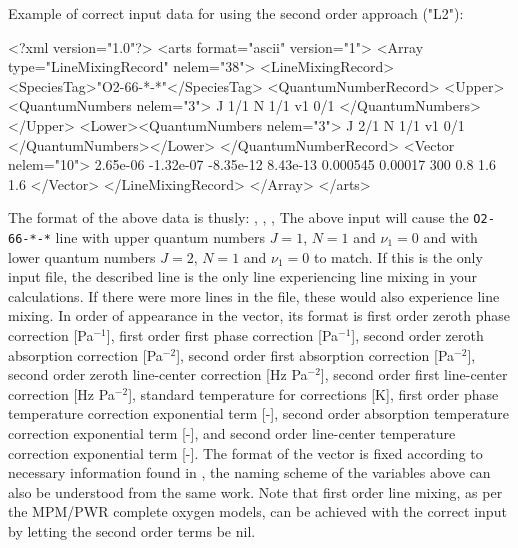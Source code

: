 Example of correct input data for using the second order approach ("L2"):
\begin{code}
<?xml version="1.0"?>
<arts format="ascii" version="1">
<Array type="LineMixingRecord" nelem="38">
<LineMixingRecord>
<SpeciesTag>"O2-66-*-*"</SpeciesTag>
<QuantumNumberRecord>
<Upper><QuantumNumbers nelem="3"> 
  J 1/1 N 1/1 v1 0/1 
</QuantumNumbers></Upper>
<Lower><QuantumNumbers nelem="3"> 
  J 2/1 N 1/1 v1 0/1 
</QuantumNumbers></Lower>
</QuantumNumberRecord>
<Vector nelem="10">
2.65e-06
-1.32e-07
-8.35e-12
8.43e-13
0.000545
0.00017
300
0.8
1.6
1.6
</Vector>
</LineMixingRecord>
</Array>
</arts>
\end{code}
The format of the above data is thusly: ,
, , 
The above input will cause the \verb|O2-66-*-*| line with
upper quantum numbers $J=1$, $N=1$ and $\nu_1=0$ and with
lower quantum numbers $J=2$, $N=1$ and $\nu_1=0$ to match.
If this is the only input file, the described line is the only
line experiencing line mixing in your calculations. If there
were more lines in the file, these would also experience line mixing.
In order of appearance in the vector, its format is 
first order zeroth phase correction [Pa$^{-1}$], 
first order first phase correction [Pa$^{-1}$],
second order zeroth absorption correction [Pa$^{-2}$],
second order first absorption correction [Pa$^{-2}$],
second order zeroth line-center correction [Hz Pa$^{-2}$],
second order first line-center correction [Hz Pa$^{-2}$],
standard temperature for corrections [K],
first order phase temperature correction exponential term [-],
second order absorption temperature correction exponential term [-], and
second order line-center temperature correction exponential term [-].
The format of the vector is fixed according to necessary information found 
in \citet{makarov11:_60-ghz_jqsrt},
the naming scheme of the variables above can also be understood from the same work.
Note that first order line mixing, as per the MPM/PWR complete oxygen models, 
can be achieved with the correct input by letting the second order terms be nil.



